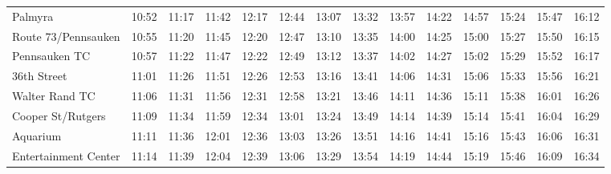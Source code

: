 \begin{center}
\begin{tabular}{@{}lrrrrrrrrrrrrr@{}}
Palmyra & 10:52 & 11:17 & 11:42 & 12:17 & 12:44 & 13:07 & 13:32 & 13:57 & 14:22 & 14:57 & 15:24 & 15:47 & 16:12 \\
Route 73/Pennsauken & 10:55 & 11:20 & 11:45 & 12:20 & 12:47 & 13:10 & 13:35 & 14:00 & 14:25 & 15:00 & 15:27 & 15:50 & 16:15 \\
Pennsauken TC & 10:57 & 11:22 & 11:47 & 12:22 & 12:49 & 13:12 & 13:37 & 14:02 & 14:27 & 15:02 & 15:29 & 15:52 & 16:17 \\
36th Street & 11:01 & 11:26 & 11:51 & 12:26 & 12:53 & 13:16 & 13:41 & 14:06 & 14:31 & 15:06 & 15:33 & 15:56 & 16:21 \\
Walter Rand TC & 11:06 & 11:31 & 11:56 & 12:31 & 12:58 & 13:21 & 13:46 & 14:11 & 14:36 & 15:11 & 15:38 & 16:01 & 16:26 \\
Cooper St/Rutgers & 11:09 & 11:34 & 11:59 & 12:34 & 13:01 & 13:24 & 13:49 & 14:14 & 14:39 & 15:14 & 15:41 & 16:04 & 16:29 \\
Aquarium & 11:11 & 11:36 & 12:01 & 12:36 & 13:03 & 13:26 & 13:51 & 14:16 & 14:41 & 15:16 & 15:43 & 16:06 & 16:31 \\
Entertainment Center & 11:14 & 11:39 & 12:04 & 12:39 & 13:06 & 13:29 & 13:54 & 14:19 & 14:44 & 15:19 & 15:46 & 16:09 & 16:34 \\
\bottomrule\end{tabular}\end{center}
